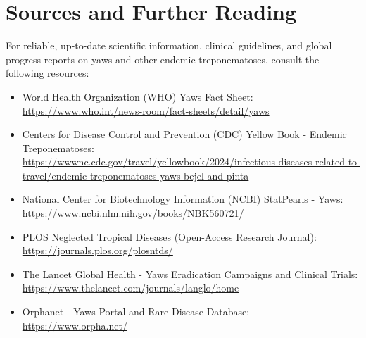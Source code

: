 \section*{Sources and Further Reading}
For reliable, up-to-date scientific information, clinical guidelines, and global progress reports on yaws and other endemic treponematoses, consult the following resources:
\begin{itemize}
    \item World Health Organization (WHO) Yaws Fact Sheet:\\ \url{https://www.who.int/news-room/fact-sheets/detail/yaws}
    \item Centers for Disease Control and Prevention (CDC) Yellow Book - Endemic Treponematoses:\\ \url{https://wwwnc.cdc.gov/travel/yellowbook/2024/infectious-diseases-related-to-travel/endemic-treponematoses-yaws-bejel-and-pinta}
    \item National Center for Biotechnology Information (NCBI) StatPearls - Yaws:\\ \url{https://www.ncbi.nlm.nih.gov/books/NBK560721/}
    \item PLOS Neglected Tropical Diseases (Open-Access Research Journal):\\ \url{https://journals.plos.org/plosntds/}
    \item The Lancet Global Health - Yaws Eradication Campaigns and Clinical Trials:\\ \url{https://www.thelancet.com/journals/langlo/home}
    \item Orphanet - Yaws Portal and Rare Disease Database:\\ \url{https://www.orpha.net/}
\end{itemize}
